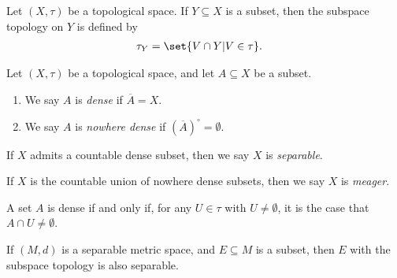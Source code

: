 \begin{definition}
Let $\left(X,\tau\right)$ be a topological space. If $Y\subseteq X$ is a subset, then the subspace topology on $Y$ is defined by
\begin{align*}
  \tau_{Y} &= \set{V\cap Y | V\in \tau}.
\end{align*}

\end{definition}
\begin{definition}\label{def:nowhere_dense}
  Let $\left(X,\tau\right)$ be a topological space, and let $A\subseteq X$ be a subset.
  \begin{enumerate}[(1)]
    \item We say $A$ is \textit{dense} if $\overline{A} = X$.
    \item We say $A$ is \textit{nowhere dense} if $\left(\overline{A}\right)^{\circ} = \emptyset$.
  \end{enumerate}
  If $X$ admits a countable dense subset, then we say $X$ is \textit{separable}.\newline

  If $X$ is the countable union of nowhere dense subsets, then we say $X$ is \textit{meager}.
\end{definition}
\begin{remark}
  A set $A$ is dense if and only if, for any $U\in \tau$ with $U\neq \emptyset$, it is the case that $A\cap U \neq \emptyset$.
\end{remark}
\begin{fact}
  If $\left(M,d\right)$ is a separable metric space, and $E\subseteq M$ is a subset, then $E$ with the subspace topology is also separable.
\end{fact}
